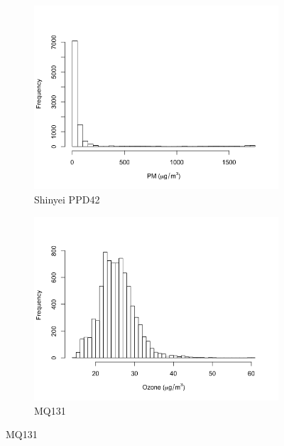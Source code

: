 \documentclass[11pt]{report}
\begin{document}
\begin{figure}[!tbp]
    \centering
    \begin{minipage}{1\linewidth}
            \begin{subfigure}[t]{.5\linewidth}
                \includegraphics[width=\textwidth]{images/pm_histogram}
                \caption{Shinyei PPD42}
                \label{fig:pm_histogram}
            \end{subfigure}
            \begin{subfigure}[t]{.5\linewidth}
            	\includegraphics[width=\textwidth]{images/ozone_histogram}
            	\caption{MQ131}
            	\label{fig:ozone_histogram}
	   \end{subfigure}

\end{minipage}
\end{figure}
\end{document}
